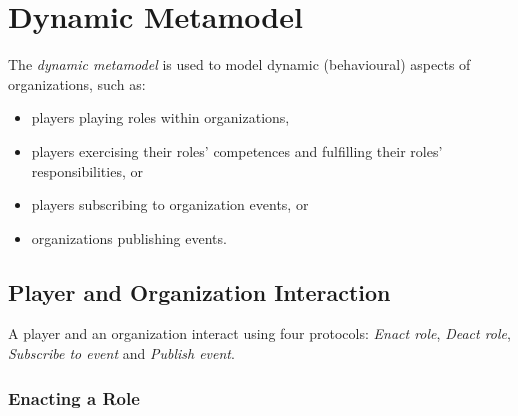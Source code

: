 
\section{Dynamic Metamodel}

The \textit{dynamic metamodel} is used to model dynamic (behavioural) aspects of organizations, such as:
\begin{itemize}
	\item players playing roles within organizations,
	\item players exercising their roles' competences and fulfilling their roles' responsibilities, or
	\item players subscribing to organization events, or
	\item organizations publishing events.
\end{itemize}

\subsection{Player and Organization Interaction}

A player and an organization interact using four protocols: \textit{Enact role}, \textit{Deact role}, \textit{Subscribe to event} and \textit{Publish event}.

\subsubsection{Enacting a Role}


